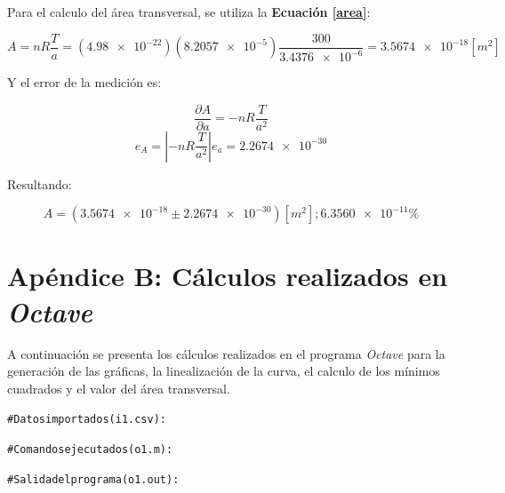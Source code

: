 \documentclass[letter,11pt]{article}
\begin{document}
Para el calculo del área transversal, se utiliza la \textbf{Ecuación \ref{area}}:

\begin{equation*}
    A = nR\frac{T}{a}
      = (\num{4.98e-22})(\num{8.2057e-5})\frac{300}{\num{3.4376e-6}}
      = \num{3.5674e-18} [m^2]
\end{equation*}
\vspace{0.10cm}

Y el error de la medición es:

\begin{equation*}
    \frac{\partial A}{\partial a} = -nR\frac{T}{a^2}
\end{equation*}
\begin{equation*}
    e_A = |-nR\frac{T}{a^2}| e_a = \num{2.2674e-30}
\end{equation*}
\vspace{0.10cm}

Resultando:

\begin{equation*}
    A = (\num{3.5674e-18} \pm \num{2.2674e-30}) [m^2]; \num{6.3560e-11}\%
\end{equation*}
\vspace{0.10cm}

\newpage
\section*{Apéndice B: Cálculos realizados en \emph{Octave}}

A continuación se presenta los cálculos realizados en el programa \emph{Octave}
para la generación de las gráficas, la linealización de la curva, el calculo
de los mínimos cuadrados y el valor del área transversal.

\begin{shaded}
\begin{alltt}
\footnotesize
\# Datos importados (i1.csv):

\# Comandos ejecutados (o1.m):



\# Salida del programa (o1.out):

\normalsize
\end{alltt}
\end{shaded}
\end{document}
